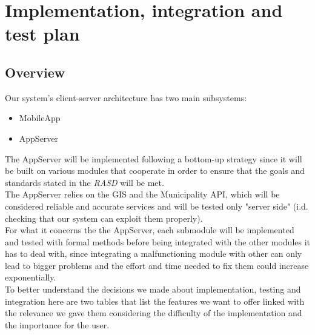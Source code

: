 \section{Implementation, integration and test plan}

    \subsection{Overview}

        Our system's client-server architecture has two main subsystems:
        \begin{itemize}           
            \item MobileApp
            \item AppServer
        \end{itemize}
        
        The AppServer will be implemented following a bottom-up strategy since it will be built on various modules that cooperate in order
        to ensure that the goals and standards stated in the \emph{RASD}\cite{RASD} will be met.\\
        The AppServer relies on the GIS and the Municipality API, which will be considered reliable and accurate services and will be
        tested only "server side" (i.d. checking that our system can exploit them properly).\\
        For what it concerns the the AppServer, each submodule will be implemented and tested with formal methods before being integrated 
        with the other modules it has to deal with, since integrating a malfunctioning module with other can only lead to bigger problems 
        and the effort and time needed to fix them could increase exponentially.\\
        To better understand the decisions we made about implementation, testing and integration here are two tables that list the features
        we want to offer linked with the relevance we gave them considering the difficulty of the implementation and the importance for 
        the user.\\

